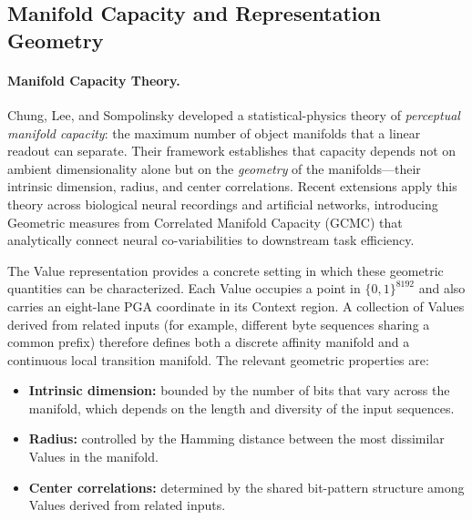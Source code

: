\subsection{Manifold Capacity and Representation Geometry}
\label{sec:related_manifold_capacity}

\paragraph{Manifold Capacity Theory.}
Chung, Lee, and Sompolinsky \citep{chung2018classification} developed a
statistical-physics theory of \emph{perceptual manifold capacity}: the
maximum number of object manifolds that a linear readout can separate.
Their framework establishes that capacity depends not on ambient
dimensionality alone but on the \emph{geometry} of the manifolds---their
intrinsic dimension, radius, and center correlations.  Recent extensions
\citep{cohen2024manifoldcapacity} apply this theory across biological
neural recordings and artificial networks, introducing Geometric measures
from Correlated Manifold Capacity (GCMC) that analytically connect
neural co-variabilities to downstream task efficiency.

The Value representation provides a concrete setting in which these
geometric quantities can be characterized.  Each Value occupies a point
in $\{0,1\}^{8192}$ and also carries an eight-lane PGA coordinate in its
Context region.  A collection of Values derived from related inputs (for
example, different byte sequences sharing a common prefix) therefore
defines both a discrete affinity manifold and a continuous local
transition manifold.  The relevant geometric properties are:

\begin{itemize}[nosep]
  \item \textbf{Intrinsic dimension:} bounded by the number of bits
        that vary across the manifold, which depends on the length and
        diversity of the input sequences.
  \item \textbf{Radius:} controlled by the Hamming distance between the
        most dissimilar Values in the manifold.
  \item \textbf{Center correlations:} determined by the shared
        bit-pattern structure among Values derived from related inputs.
\end{itemize}

